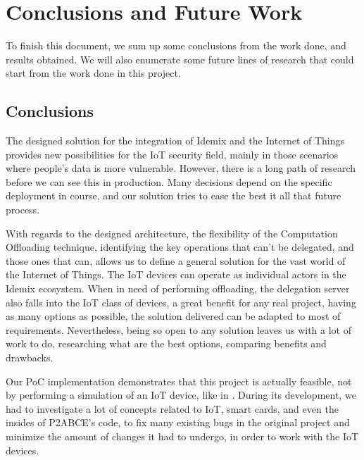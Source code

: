 \chapter{Conclusions and Future Work}\label{ch:conclusions}

To finish this document, we sum up some conclusions from the work done, and results 
obtained. We will also enumerate some future lines of research that could start from
the work done in this project.

\section{Conclusions}


The designed solution for the integration of Idemix and the Internet of Things provides new possibilities for the IoT security field, mainly in those scenarios where people's data is more vulnerable. However, there is a long path of research before we can see this in production. Many decisions depend on the specific deployment in course, and our solution tries to ease the best it all that future process.

With regards to the designed architecture, the flexibility of the Computation Offloading technique, identifying the key operations that can't be delegated, and those ones that can, allows us to define a general solution for the vast world of the Internet of Things. The IoT devices can operate as individual actors in the Idemix ecosystem. When in need of performing offloading, the delegation server also falls into the IoT class of devices, a great benefit for any real project, having as many options as possible, the solution delivered can be adapted to most of requirements. Nevertheless, being so open to any solution leaves us with a lot of work to do, researching what are the best options, comparing benefits and drawbacks.

Our PoC implementation demonstrates that this project is actually feasible, not by performing a simulation of an IoT device, like in \citep{vanet}. During its development, we had to investigate a lot of concepts related to IoT, smart cards, and even the insides of P2ABCE's code, to fix many existing bugs in the original project and minimize the amount of changes it had to undergo, in order to work with the IoT devices. 


